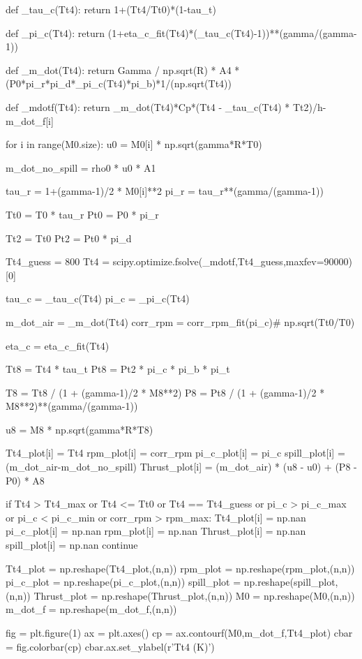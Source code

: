 \documentclass[journal ]{new-aiaa}
\begin{document}
\begin{python}
def _tau_c(Tt4):
    return 1+(Tt4/Tt0)*(1-tau_t)

def _pi_c(Tt4):
    return  (1+eta_c_fit(Tt4)*(_tau_c(Tt4)-1))**(gamma/(gamma-1))

def _m_dot(Tt4):
    return Gamma / np.sqrt(R) * A4 * (P0*pi_r*pi_d*_pi_c(Tt4)*pi_b)*1/(np.sqrt(Tt4))

def _mdotf(Tt4):
    return _m_dot(Tt4)*Cp*(Tt4 - _tau_c(Tt4) * Tt2)/h-m_dot_f[i]

for i in range(M0.size):
    u0 = M0[i] * np.sqrt(gamma*R*T0)
    
    m_dot_no_spill = rho0 * u0 * A1
    
    tau_r = 1+(gamma-1)/2 * M0[i]**2
    pi_r = tau_r**(gamma/(gamma-1))
    
    Tt0 = T0 * tau_r
    Pt0 = P0 * pi_r
    
    Tt2 = Tt0
    Pt2 = Pt0 * pi_d
    
    Tt4_guess = 800
    Tt4 = scipy.optimize.fsolve(_mdotf,Tt4_guess,maxfev=90000)[0]
    
    tau_c = _tau_c(Tt4)
    pi_c = _pi_c(Tt4)

    m_dot_air = _m_dot(Tt4)
    corr_rpm = corr_rpm_fit(pi_c)# np.sqrt(Tt0/T0)
    
    eta_c = eta_c_fit(Tt4)
    
    
    Tt8 = Tt4 * tau_t
    Pt8 = Pt2 * pi_c * pi_b * pi_t
    
    T8 = Tt8 / (1 + (gamma-1)/2 * M8**2)
    P8 = Pt8 / (1 + (gamma-1)/2 * M8**2)**(gamma/(gamma-1))
    
    u8 = M8 * np.sqrt(gamma*R*T8)
    
    Tt4_plot[i] = Tt4
    rpm_plot[i] = corr_rpm
    pi_c_plot[i] = pi_c
    spill_plot[i] = (m_dot_air-m_dot_no_spill)
    Thrust_plot[i] = (m_dot_air) * (u8 - u0) + (P8 - P0) * A8
    
    if Tt4 > Tt4_max or Tt4 <= Tt0 or Tt4 == Tt4_guess or pi_c > pi_c_max or pi_c < pi_c_min or corr_rpm > rpm_max:
        Tt4_plot[i] = np.nan
        pi_c_plot[i] = np.nan
        rpm_plot[i] = np.nan
        Thrust_plot[i] = np.nan
        spill_plot[i] = np.nan
        continue

Tt4_plot = np.reshape(Tt4_plot,(n,n))
rpm_plot = np.reshape(rpm_plot,(n,n))
pi_c_plot = np.reshape(pi_c_plot,(n,n))
spill_plot = np.reshape(spill_plot,(n,n))
Thrust_plot = np.reshape(Thrust_plot,(n,n))
M0 = np.reshape(M0,(n,n))
m_dot_f = np.reshape(m_dot_f,(n,n))

fig = plt.figure(1)
ax = plt.axes()
cp = ax.contourf(M0,m_dot_f,Tt4_plot)
cbar = fig.colorbar(cp)
cbar.ax.set_ylabel(r'Tt4 (K)')


\end{python}
\end{document}
